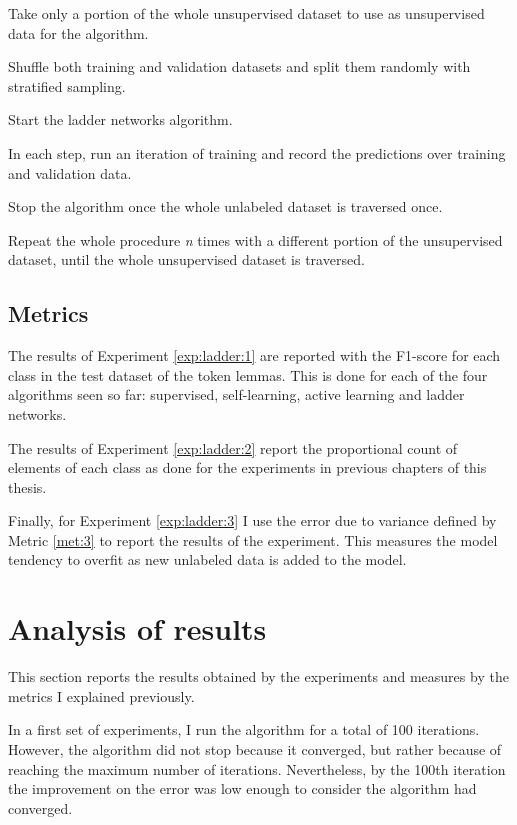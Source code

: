 \begin{experiment}\label{exp:ladder:3}
  \begin{enumexp}
    \item Take only a portion of the whole unsupervised dataset to use as
      unsupervised data for the algorithm.
    \item Shuffle both training and validation datasets and split them randomly
      with stratified sampling.
    \item Start the ladder networks algorithm.
    \item In each step, run an iteration of training and record the predictions
      over training and validation data.
    \item Stop the algorithm once the whole unlabeled dataset is traversed
      once.
    \item Repeat the whole procedure {\em n} times with a different portion of
      the unsupervised dataset, until the whole unsupervised dataset is
      traversed.
  \end{enumexp}
\end{experiment}

\subsection{Metrics}

The results of Experiment \ref{exp:ladder:1} are reported with the F1-score for
each class in the test dataset of the token lemmas. This is done for each of
the four algorithms seen so far: supervised, self-learning, active learning and
ladder networks.

The results of Experiment \ref{exp:ladder:2} report the proportional count of
elements of each class as done for the experiments in previous chapters of this
thesis.

Finally, for Experiment \ref{exp:ladder:3} I use the error due to variance
defined by Metric \ref{met:3} to report the results of the experiment. This
measures the model tendency to overfit as new unlabeled data is added to the
model.

\section{Analysis of results}\label{sec:ladder:results}

This section reports the results obtained by the experiments and measures by
the metrics I explained previously.

In a first set of experiments, I run the algorithm for a total of 100
iterations. However, the algorithm did not stop because it converged, but rather
because of reaching the maximum number of iterations. Nevertheless, by the
100th iteration the improvement on the error was low enough to consider the
algorithm had converged.

